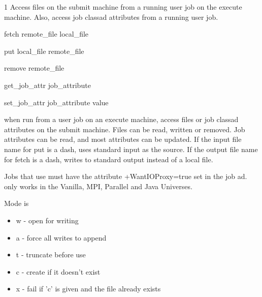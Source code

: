 \begin{ManPage}{\label{man-condor-chirp}}{1}
{Access files on the submit machine from a running user job on the execute machine.  Also, access job classad attributes from a running user job.}
\Synopsis
{}

{fetch remote\_file local\_file}

{put   local\_file remote\_file}

{remove remote\_file}

{get\_job\_attr job\_attribute}

{set\_job\_attr job\_attribute value}

\Description 
{} when run from a user job on an execute machine, access
files or job classad attributes on the submit machine.  Files can be
read, written or removed.  Job attributes can be read, and most
attributes can be updated.  If the input file name for put is a dash,
 uses standard input as the source.  If the output file
name for fetch is a dash,  writes to standard output
instead of a local file.


Jobs that use  must have the attribute
+WantIOProxy=true set in the job ad.  only works in the
Vanilla, MPI, Parallel and Java Universes.

\begin{Options}
\end{Options}

Mode is \begin{itemize}
\item w - open for writing
\item a - force all writes to append
\item t - truncate before use
\item c - create if it doesn't exist
\item x - fail if 'c' is given and the file already exists
\end{itemize}




\end{ManPage}
